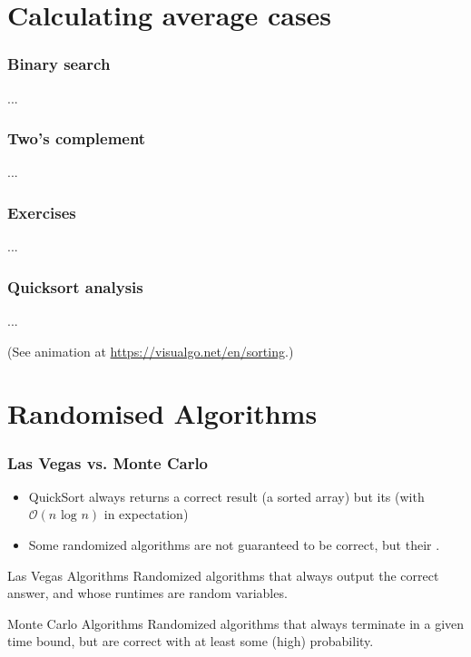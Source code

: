 \documentclass[aspectratio=169]{beamer}
\begin{document}
\section{Calculating average cases}

\begin{frame}[fragile]\frametitle{Binary search}
    
...

\end{frame}


\begin{frame}[fragile]\frametitle{Two's complement}
    
...

\end{frame}

\begin{frame}\frametitle{Exercises}
    
...

\end{frame}

\begin{frame}[fragile]\frametitle{Quicksort analysis}
    
...

(See animation at \url{https://visualgo.net/en/sorting}.)

\end{frame}


\section{Randomised Algorithms}


\begin{frame}\frametitle{Las Vegas vs. Monte Carlo}

\begin{itemize}
  \item QuickSort always returns a \alert{correct result} (a sorted array) but its  (with $\mathcal{O}(n\text{ log }n)$ in expectation)
  \item Some randomized algorithms are \alert{not guaranteed to be correct}, but their .
\end{itemize}

\begin{block}{Las Vegas Algorithms}
Randomized algorithms that always output the correct answer, and whose runtimes are random variables.
\end{block}

\begin{alertblock}{Monte Carlo Algorithms}
Randomized algorithms that always terminate in a given time bound, but are correct with at least some (high) probability.
\end{alertblock}

\end{frame}


\end{document}
